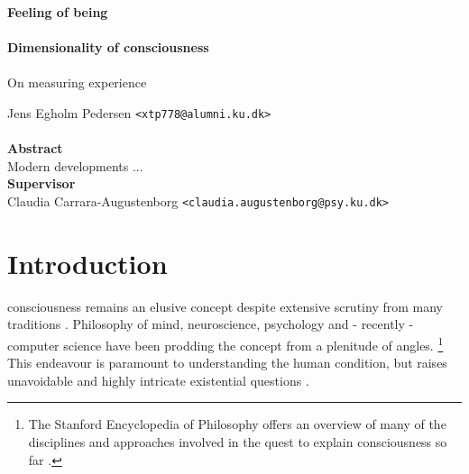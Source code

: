 \documentclass[a4paper,oneside]{memoir}
\begin{document}
    \thispagestyle{empty}
    \begin{adjustwidth}{-3cm}{-1.5cm}
    \vspace*{-1cm}
    \textbf{\Huge Feeling of being} \\
    \vspace*{2.5cm} \\
    \textbf{\Huge Dimensionality of consciousness} \\
    \vspace*{.1cm} \\
    {\huge On measuring experience} \\
    \begin{tabbing}
    Jens Egholm Pedersen \hspace{1cm} \= \texttt{<xtp778@alumni.ku.dk>} \\
    \\[2cm]
    \textbf{\Large Abstract} \\
    Modern developments ...
    \\[6cm]

    \textbf{\Large Supervisor} \\
    Claudia Carrara-Augustenborg \hspace{1cm} \texttt{<claudia.augustenborg@psy.ku.dk>} \\
    \end{tabbing}
    \end{adjustwidth}
    \newpage
    \ClearWallPaper

\chapter{Introduction}
\Gls{consciousness} remains an elusive concept despite extensive scrutiny
from many traditions \autocite{sep-consciousness}. Philosophy of mind,
neuroscience, psychology and - recently - computer science have been
prodding the concept from a plenitude of angles.
\footnote{The Stanford Encyclopedia of Philosophy offers an overview of
many of the disciplines and approaches involved in the quest to explain
\gls{consciousness} so far \autocite{sep-consciousness}.}
This endeavour is paramount to understanding the human condition, but
raises unavoidable and highly intricate existential questions
\autocite{amodei2016, soares2016}.
\end{document}
